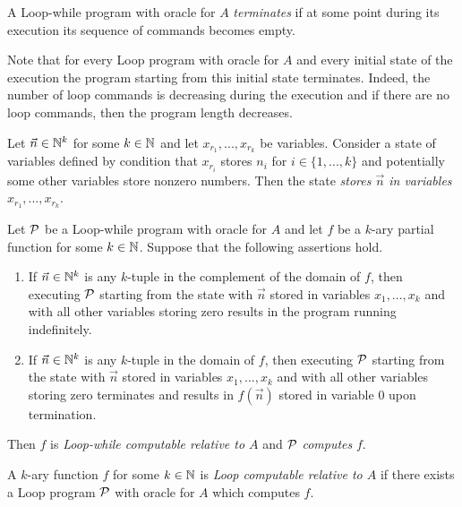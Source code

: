 \documentclass[10pt]{amsart}
\begin{document}
\begin{definition}
	A Loop-while program with oracle for $A$ \textit{terminates} if at some point during its execution its sequence of commands becomes empty.
\end{definition}

\begin{remark}\label{remark:each_Loop_program_execution_terminates}
	Note that for every Loop program with oracle for $A$ and every initial state of the execution the program starting from this initial state terminates. Indeed, the number of loop commands is decreasing during the execution and if there are no loop commands, then the program length decreases.
\end{remark}

\begin{definition}
	Let $\vec{n}\in {\mathbb N}^k$ for some $k\in {\mathbb N}$ and let $x_{r_1},...,x_{r_k}$ be variables. Consider a state of variables defined by condition that $x_{r_i}$ stores $n_i$ for $i \in \{1,...,k\}$ and potentially some other variables store nonzero numbers. Then the state \textit{stores $\vec{n}$ in variables $x_{r_1},...,x_{r_k}$}.
\end{definition}

\begin{definition}
	Let ${\mathcal P}$ be a Loop-while program with oracle for $A$ and let $f$ be a $k$-ary partial function for some $k \in {\mathbb N}$. Suppose that the following assertions hold.
	\begin{enumerate}[label=\textbf{(\arabic*)}, leftmargin=3.0em]
		\item If $\vec{n}\in {\mathbb N}^k$ is any $k$-tuple in the complement of the domain of $f$, then executing ${\mathcal P}$ starting from the state with $\vec{n}$ stored in variables $x_1,...,x_k$ and with all other variables storing zero results in the program running indefinitely.
		\item If $\vec{n} \in {\mathbb N}^k$ is any $k$-tuple in the domain of $f$, then executing ${\mathcal P}$ starting from the state with $\vec{n}$ stored in variables $x_1,...,x_k$ and with all other variables storing zero terminates and results in $f(\vec{n})$ stored in variable $0$ upon termination.
	\end{enumerate}
	Then $f$ is \textit{Loop-while computable relative to $A$} and ${\mathcal P}$ \textit{computes} $f$.
\end{definition}

\begin{definition}
	A $k$-ary function $f$ for some $k \in {\mathbb N}$ is \textit{Loop computable relative to $A$} if there exists a Loop program ${\mathcal P}$ with oracle for $A$ which computes $f$.
\end{definition}
\end{document}

